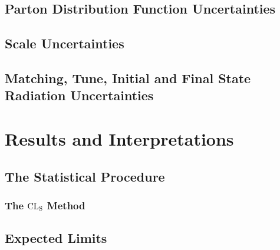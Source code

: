 \documentclass[10pt,twoside,cucitura,classica,openany]{toptesi}
\begin{document}


\subsection{Parton Distribution Function Uncertainties}
\label{sec:part-distr-funct}



\subsection{Scale Uncertainties}
\label{sec:scale-uncertainty}



\subsection{Matching, Tune, Initial and Final State Radiation Uncertainties}
\label{sec:initial-final-state}



\section{Results and Interpretations}
\label{sec:results}




% 

\subsection{The Statistical Procedure}
\label{sec:stat-proc}



\subsubsection{The $\mathrm{CL}_\mathrm{S}$ Method}
\label{sec:cls-method}



\subsection{Expected Limits}
\label{sec:expected-limits}
\end{document}
